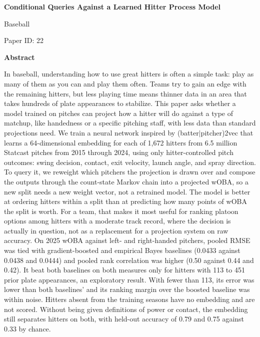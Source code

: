 \documentclass[11pt,letterpaper]{article}
\newcommand{\papertitle}{Conditional Queries Against a Learned Hitter Process Model}
\newcommand{\papertrack}{Baseball}
\newcommand{\paperid}{Paper ID: 22}
\begin{document}
\raggedright
\thispagestyle{fancy}
\begin{center}
{\fontsize{18}{22}\selectfont\bfseries \papertitle\par}
\vspace{11pt}
{\fontsize{14}{17}\selectfont \papertrack\par \paperid\par}
\end{center}

\begin{center}{\fontsize{16}{19}\selectfont\bfseries Abstract}\end{center}
\vspace{-11pt}
In baseball, understanding how to use great hitters is often a simple task: play as many of them as you can and play them often. Teams try to gain an edge with the remaining hitters, but less playing time means thinner data in an area that takes hundreds of plate appearances to stabilize. This paper asks whether a model trained on pitches can project how a hitter will do against a type of matchup, like handedness or a specific pitching staff, with less data than standard projections need. We train a neural network inspired by (batter$|$pitcher)2vec that learns a 64-dimensional embedding for each of 1,672 hitters from 6.5 million Statcast pitches from 2015 through 2024, using only hitter-controlled pitch outcomes: swing decision, contact, exit velocity, launch angle, and spray direction. To query it, we reweight which pitchers the projection is drawn over and compose the outputs through the count-state Markov chain into a projected wOBA, so a new split needs a new weight vector, not a retrained model. The model is better at ordering hitters within a split than at predicting how many points of wOBA the split is worth. For a team, that makes it most useful for ranking platoon options among hitters with a moderate track record, where the decision is actually in question, not as a replacement for a projection system on raw accuracy. On 2025 wOBA against left- and right-handed pitchers, pooled RMSE was tied with gradient-boosted and empirical Bayes baselines (0.0433 against 0.0438 and 0.0444) and pooled rank correlation was higher (0.50 against 0.44 and 0.42). It beat both baselines on both measures only for hitters with 113 to 451 prior plate appearances, an exploratory result. With fewer than 113, its error was lower than both baselines' and its ranking margin over the boosted baseline was within noise. Hitters absent from the training seasons have no embedding and are not scored. Without being given definitions of power or contact, the embedding still separates hitters on both, with held-out accuracy of 0.79 and 0.75 against 0.33 by chance.
\end{document}
